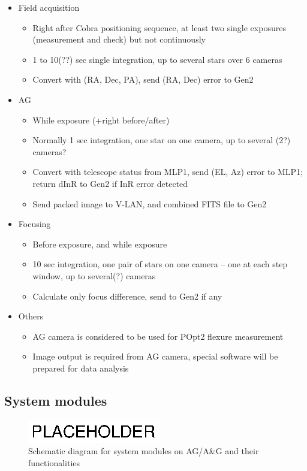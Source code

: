 \documentclass[a4paper,notitlepage]{article}
\begin{document}
\begin{itemize}
  \item Field acquisition
  \begin{itemize}
    \item Right after Cobra positioning sequence, at least two single exposures 
      (measurement and check) but not continuously
    \item 1 to 10(??) sec single integration, up to several stars over 6 cameras
    \item Convert with (RA, Dec, PA), send (RA, Dec) error to Gen2
  \end{itemize}
  \item AG
  \begin{itemize}
    \item While exposure (+right before/after)
    \item Normally 1 sec integration, one star on one camera, up to several (2?) cameras?
    \item Convert with telescope status from MLP1, send (EL, Az) error to MLP1; return dInR to Gen2 if InR error detected
    \item Send packed image to V-LAN, and combined FITS file to Gen2
  \end{itemize}
  \item Focusing
  \begin{itemize}
    \item Before exposure, and while exposure
    \item 10 sec integration, one pair of stars on one camera -- one at each step window, up to several(?) cameras
    \item Calculate only focus difference, send to Gen2 if any
  \end{itemize}
  \item Others
  \begin{itemize}
    \item AG camera is considered to be used for POpt2 flexure measurement
    \item Image output is required from AG camera, special software will be prepared for data analysis
  \end{itemize}
\end{itemize}

\subsection{System modules}

\begin{figure}[htb]
  \begin{center}
    \includegraphics{ag_system_modules.eps}
  \end{center}
  \caption{Schematic diagram for system modules on AG/A\&G and their functionalities}
  \label{fig:system_modules}
\end{figure}
\end{document}
